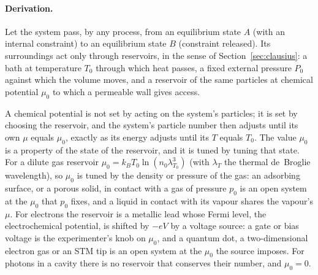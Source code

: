 \documentclass[10pt,a4paper]{article}
\theoremstyle{remark}
\begin{document}
\paragraph{Derivation.} Let the system pass, by any process, from an
equilibrium state $A$ (with an internal constraint) to an equilibrium state $B$
(constraint released). Its surroundings act only through reservoirs, in the
sense of Section~\ref{sec:clausius}: a bath at temperature $T_0$ through which
heat passes, a fixed external pressure $P_0$ against which the volume moves,
and a reservoir of the same particles at chemical potential $\mu_0$ to which a
permeable wall gives access.

A chemical potential is not set by acting on the system's particles; it is set
by choosing the reservoir, and the system's particle number then adjusts until
its own $\mu$ equals $\mu_0$, exactly as its energy adjusts until its $T$
equals $T_0$. The value $\mu_0$ is a property of the state of the reservoir,
and it is tuned by tuning that state. For a dilute gas reservoir
$\mu_0=k_BT_0\ln(n_0\lambda_{T_0}^{3})$ (with $\lambda_T$ the thermal de~Broglie
wavelength), so $\mu_0$ is tuned by the density or pressure of the gas: an
adsorbing surface, or a porous solid, in contact with a gas of pressure $p_0$ is
an open system at the $\mu_0$ that $p_0$ fixes, and a liquid in contact with its
vapour shares the vapour's $\mu$. For electrons the reservoir is a metallic lead
whose Fermi level, the electrochemical potential, is shifted by $-eV$ by a
voltage source: a gate or bias voltage is the experimenter's knob on $\mu_0$,
and a quantum dot, a two-dimensional electron gas or an STM tip is an open
system at the $\mu_0$ the source imposes. For photons in a cavity there is no
reservoir that conserves their number, and $\mu_0=0$.
\end{document}
